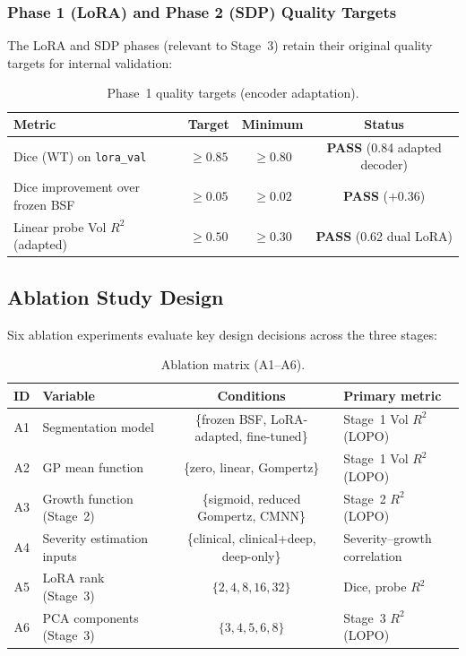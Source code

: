 \subsubsection{Phase 1 (LoRA) and Phase 2 (SDP) Quality Targets}

The LoRA and SDP phases (relevant to Stage~3) retain their original quality
targets for internal validation:

\begin{table}[H]
  \centering
  \caption{Phase~1 quality targets (encoder adaptation).}
  \label{tab:quality_phase1}
  \begin{tabular}{lccc}
    \toprule
    \textbf{Metric} & \textbf{Target} & \textbf{Minimum} & \textbf{Status} \\
    \midrule
    Dice (WT) on \texttt{lora\_val} & $\geq 0.85$ & $\geq 0.80$ & \textbf{PASS} (0.84 adapted decoder) \\
    Dice improvement over frozen BSF & $\geq 0.05$ & $\geq 0.02$ & \textbf{PASS} ($+0.36$) \\
    Linear probe Vol $R^2$ (adapted) & $\geq 0.50$ & $\geq 0.30$ & \textbf{PASS} (0.62 dual LoRA) \\
    \bottomrule
  \end{tabular}
\end{table}

\subsection{Ablation Study Design}
\label{sec:eval:ablations}

Six ablation experiments evaluate key design decisions across the three
stages:

\begin{table}[H]
  \centering
  \caption{Ablation matrix (A1--A6).}
  \label{tab:ablation_matrix}
  \begin{tabular}{clcp{5.5cm}}
    \toprule
    \textbf{ID} & \textbf{Variable} & \textbf{Conditions} &
      \textbf{Primary metric} \\
    \midrule
    A1 & Segmentation model & \{frozen BSF, LoRA-adapted, fine-tuned\}
      & Stage~1 Vol $R^2$ (LOPO) \\
    A2 & GP mean function & \{zero, linear, Gompertz\}
      & Stage~1 Vol $R^2$ (LOPO) \\
    A3 & Growth function (Stage~2) & \{sigmoid, reduced Gompertz, CMNN\}
      & Stage~2 $R^2$ (LOPO) \\
    A4 & Severity estimation inputs & \{clinical, clinical+deep, deep-only\}
      & Severity--growth correlation \\
    A5 & LoRA rank (Stage~3) & $\{2, 4, 8, 16, 32\}$
      & Dice, probe $R^2$ \\
    A6 & PCA components (Stage~3) & $\{3, 4, 5, 6, 8\}$
      & Stage~3 $R^2$ (LOPO) \\
    \bottomrule
  \end{tabular}
\end{table}

